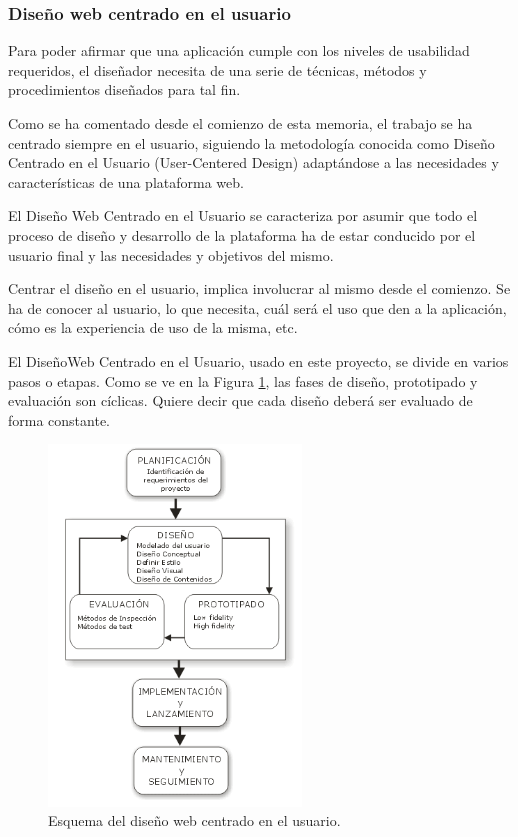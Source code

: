\subsubsection{Diseño web centrado en el usuario}

Para poder afirmar que una aplicación cumple con los niveles de usabilidad requeridos, el diseñador necesita de una serie de técnicas, métodos y procedimientos diseñados para tal fin.

Como se ha comentado desde el comienzo de esta memoria, el trabajo se ha centrado siempre en el usuario, siguiendo la metodología conocida como Diseño Centrado en el Usuario (User-Centered Design) adaptándose a las necesidades y características de una plataforma web.

El Diseño Web Centrado en el Usuario se caracteriza por asumir que todo el proceso de diseño y desarrollo de la plataforma ha de estar conducido por el usuario final y las necesidades y objetivos del mismo.

Centrar el diseño en el usuario, implica involucrar al mismo desde el comienzo. Se ha de conocer al usuario, lo que necesita, cuál será el uso que den a la aplicación, cómo es la experiencia de uso de la misma, etc.

El DiseñoWeb Centrado en el Usuario, usado en este proyecto, se divide en varios pasos o etapas. Como se ve en la Figura \ref{ciclo}, las fases de diseño, prototipado y evaluación son cíclicas. Quiere decir que cada diseño deberá ser evaluado de forma constante. 

\begin{figure}[h]
  \centering
    \includegraphics[width=0.6\textwidth]{../img/dwcu/ciclo.png}
  \caption{Esquema del diseño web centrado en el usuario.}
  \label{ciclo}
\end{figure}



